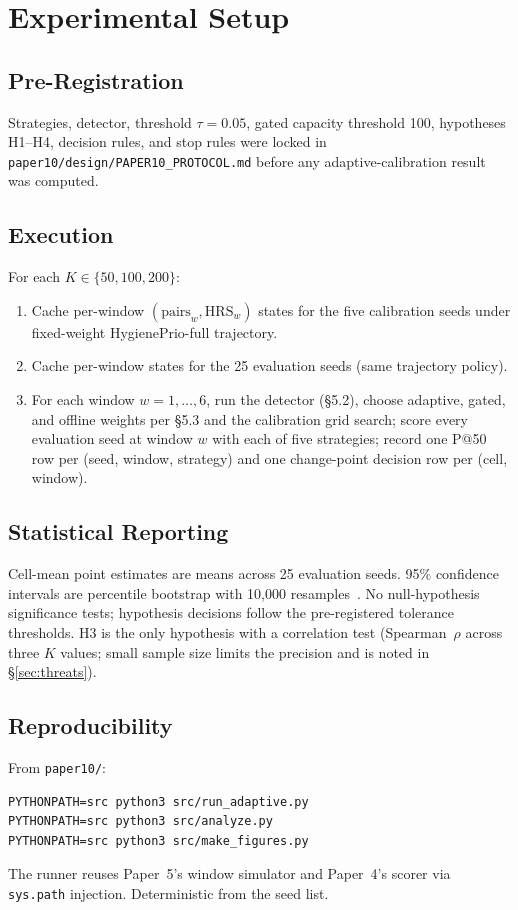 \section{Experimental Setup}

\subsection{Pre-Registration}

Strategies, detector, threshold $\tau = 0.05$, gated capacity
threshold 100, hypotheses H1--H4, decision rules, and stop rules were
locked in
\texttt{paper10/design/PAPER10\_PROTOCOL.md} before any
adaptive-calibration result was computed.

\subsection{Execution}

For each $K \in \{50, 100, 200\}$:
\begin{enumerate}
\item Cache per-window $(\text{pairs}_w, \text{HRS}_w)$ states for
the five calibration seeds under fixed-weight HygienePrio-full
trajectory.
\item Cache per-window states for the 25 evaluation seeds (same
trajectory policy).
\item For each window $w = 1, \ldots, 6$, run the detector (\S5.2),
choose \textsf{adaptive}, \textsf{gated}, and \textsf{offline}
weights per \S5.3 and the calibration grid search; score every
evaluation seed at window $w$ with each of five strategies; record
one P@50 row per (seed, window, strategy) and one change-point
decision row per (cell, window).
\end{enumerate}

\subsection{Statistical Reporting}

Cell-mean point estimates are means across 25 evaluation seeds. 95\%
confidence intervals are percentile bootstrap with 10{,}000
resamples~\cite{efron1994introduction}. No null-hypothesis significance
tests; hypothesis decisions follow the pre-registered tolerance
thresholds. H3 is the only hypothesis with a correlation test
(Spearman~$\rho$ across three $K$ values; small sample size limits
the precision and is noted in \S\ref{sec:threats}).

\subsection{Reproducibility}

From \texttt{paper10/}:
{\small\begin{verbatim}
PYTHONPATH=src python3 src/run_adaptive.py
PYTHONPATH=src python3 src/analyze.py
PYTHONPATH=src python3 src/make_figures.py
\end{verbatim}}
The runner reuses Paper~5's window simulator and Paper~4's scorer
via \texttt{sys.path} injection. Deterministic from the seed list.
